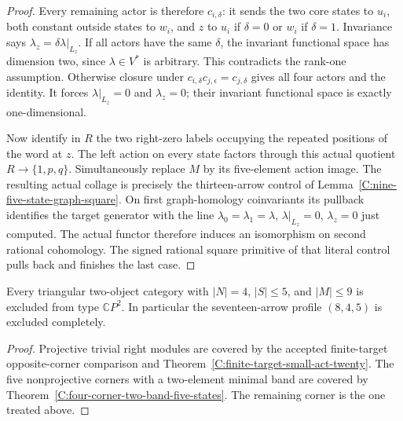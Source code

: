\begin{proof}
Every remaining actor is therefore $c_{i,\delta}$:
it sends the two core states to $u_i$, both constant
outside states to $w_i$, and $z$ to $u_i$ if $\delta=0$
or $w_i$ if $\delta=1$. Invariance says
$\lambda_z=\delta\lambda|_{L_z}$.
If all actors have the same $\delta$, the invariant
functional space has dimension two, since $\lambda\in V^*$
is arbitrary. This contradicts the rank-one assumption.
Otherwise closure under
$c_{i,\delta}c_{j,\epsilon}=c_{j,\delta}$ gives all
four actors and the identity. It forces
$\lambda|_{L_z}=0$ and $\lambda_z=0$; their invariant
functional space is exactly one-dimensional.

Now identify in $R$ the two right-zero labels occupying
the repeated positions of the word at $z$. The left action
on every state factors through this actual quotient
$R\to\{1,p,q\}$. Simultaneously replace $M$ by its
five-element action image. The resulting actual collage
is precisely the thirteen-arrow control of
Lemma~\ref{C:nine-five-state-graph-square}.
On first graph-homology coinvariants its pullback identifies
the target generator with the line
$\lambda_0=\lambda_1=\lambda$, $\lambda|_{L_z}=0$,
$\lambda_z=0$ just computed. The actual functor therefore
induces an isomorphism on second rational cohomology.
The signed rational square primitive of that literal
control pulls back and finishes the last case.
\end{proof}

\begin{corollary}
\label{C:four-corners-five-state-eighteen}
Every triangular two-object category with $|N|=4$,
$|S|\leq5$, and $|M|\leq9$ is excluded from type
$\mathbb CP^2$. In particular the seventeen-arrow profile
$(8,4,5)$ is excluded completely.
\end{corollary}
\begin{proof}
Projective trivial right modules are covered by the accepted
finite-target opposite-corner comparison and
Theorem~\ref{C:finite-target-small-act-twenty}.
The five nonprojective corners with a two-element minimal
band are covered by
Theorem~\ref{C:four-corner-two-band-five-states}.
The remaining corner is the one treated above.
\end{proof}
